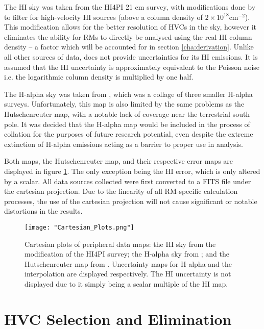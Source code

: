 The HI sky was taken from the HI4PI 21 cm survey, with modifications done by \cite{ID6} to filter for high-velocity HI sources (above a column density of $2\times 10^{18} \mathrm{cm}^{-2}$). This modification allows for the better resolution of HVCs in the sky, however it eliminates the ability for RMs to directly be analysed using the real HI column density – a factor which will be accounted for in section \ref{cha:derivation}. Unlike all other sources of data, \cite{ID6} does not provide uncertainties for its HI emissions. It is assumed that the HI uncertainty is approximately equivalent to the Poisson noise i.e. the logarithmic column density is multiplied by one half.


The H-alpha sky was taken from \cite{ID43}, which was a collage of three smaller H-alpha surveys. Unfortunately, this map is also limited by the same problems as the Hutschenreuter map, with a notable lack of coverage near the terrestrial south pole. It was decided that the H-alpha map would be included in the process of collation for the purposes of future research potential, even despite the extreme extinction of H-alpha emissions acting as a barrier to proper use in analysis.


Both maps, the Hutschenreuter map, and their respective error maps are displayed in figure \ref{fig:maps}. The only exception being the HI error, which is only altered by a scalar. All data sources collected were first converted to a FITS file under the cartesian projection. Due to the linearity of all RM-specific calculation processes, the use of the cartesian projection will not cause significant or notable distortions in the results.

\begin{figure}
    \texttt{[image: "Cartesian\_Plots.png"]}
    \centering
    \caption{Cartesian plots of peripheral data maps: the HI sky from the \cite{ID6} modification of the HI4PI survey; the H-alpha sky from \citep{ID43}; and the Hutschenreuter map from \cite{ID44, ID45}. Uncertainty maps for H-alpha and the interpolation are displayed respectively. The HI uncertainty is not displayed due to it simply being a scalar multiple of the HI map.}
    \label{fig:maps}
\end{figure}

\section{HVC Selection and Elimination}
\label{sec:hvc_sel}

